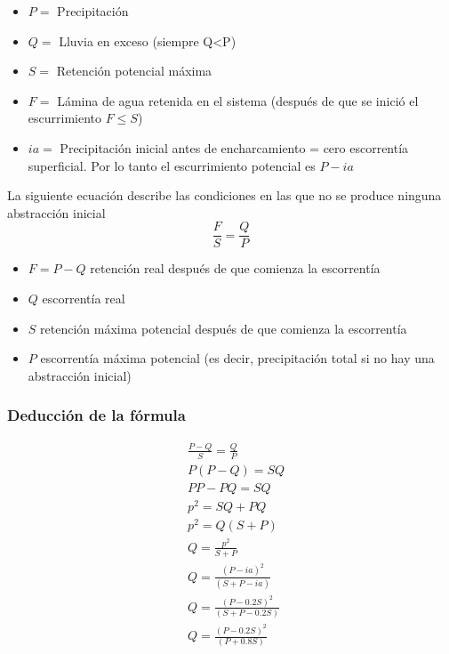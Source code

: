     \begin{notation}
        \begin{itemize}
            \item $P=$ Precipitación
            \item $Q=$ Lluvia en exceso (siempre Q<P)
            \item $S=$ Retención potencial máxima
            \item $F=$ Lámina de agua retenida en el sistema (después de que se inició el escurrimiento $F\leq S$)
            \item $ia=$ Precipitación inicial antes de encharcamiento = cero escorrentía superficial. Por lo tanto el escurrimiento potencial es $P-ia$
        \end{itemize}
    \end{notation}
    La siguiente ecuación describe las condiciones en las que no se produce ninguna abstracción inicial
    \begin{equation}
        \frac{F}{S}=\frac{Q}{P}
    \end{equation}
    \begin{notation}
        \begin{itemize}
            \item $F=P-Q$ retención real después de que comienza la escorrentía
            \item $Q$ escorrentía real
            \item $S$ retención máxima potencial después de que comienza la escorrentía
            \item $P$ escorrentía máxima potencial (es decir, precipitación total si no hay una abstracción inicial)
        \end{itemize}
    \end{notation}
    \subsubsection{Deducción de la fórmula}
    \begin{align*}
        &\frac{P-Q}{S}=\frac{Q}{P}\\
        &P(P-Q)=SQ\\
        &PP-PQ=SQ\\ 
        &p^2=SQ+PQ\\ 
        &p^2=Q(S+P)\\
        &Q=\frac{p^2}{S+P}\\
        &Q=\frac{(P-ia)^2}{(S+P-ia)}\\
        &Q=\frac{(P-0.2S)^2}{(S+P-0.2S)}\\
        &Q=\frac{(P-0.2S)^2}{(P+0.8S)}
    \end{align*}
